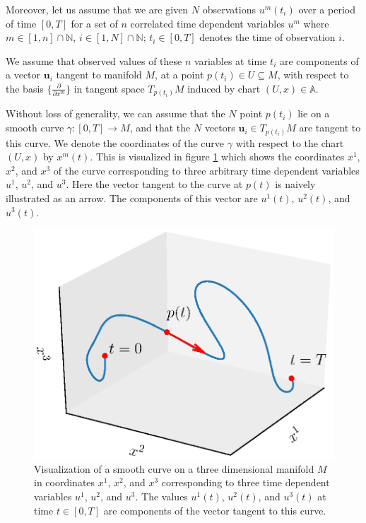 \documentclass[a4paper,11pt]{elsarticle}
\begin{document}
Moreover, let us assume that we are given $N$ observations
$u^{m}(t_{i})$ over a period of time $[0,T]$ for a set of $n$
correlated time dependent variables $u^{m}$ where $m \in [1,n] \cap
\mathbb{N}$, $i \in[1,N] \cap \mathbb{N}$; $t_{i} \in [0,T]$ denotes
the time of observation $i$.

We assume that observed values of these $n$ variables at time $t_{i}$
are components of a vector $\mathbf{u}_{i}$ tangent to manifold $M$,
at a point $p(t_{i}) \in U \subseteq M$, with respect to the basis
$\{\frac{\partial}{\partial{x^{m}}}\}$ in tangent space $T_{p(t_{i})}M$
induced by chart $(U, x) \in \mathbb{A}$.

Without loss of generality, we can assume that the $N$ point $p(t_{i})$
lie on a smooth curve $\gamma:[0,T] \to M$, and that the $N$ vectors
$\mathbf{u}_{i} \in T_{p(t_{i})}M$ are tangent to this curve. We denote
the coordinates of the curve $\gamma$ with respect to the chart $(U,
x)$ by $x^{m}(t)$. This is visualized in figure
\ref{fig:visualization} which shows the coordinates $x^{1}$, $x^{2}$,
and $x^{3}$ of the curve corresponding to three arbitrary time
dependent variables $u^{1}$, $u^{2}$, and $u^{3}$. Here the vector
tangent to the curve at $p(t)$ is naively illustrated as an
arrow. The components of this vector are $u^{1}(t)$, $u^{2}(t)$, and
$u^{3}(t)$.

\begin{figure}[h]
  \centering
  \includegraphics[scale=0.6, bb=0 0 461 346,trim={1cm 1cm 1cm 2cm},clip]{visualization.eps}
  \caption{Visualization of a smooth curve on a three dimensional
    manifold $M$ in coordinates $x^{1}$, $x^{2}$, and $x^{3}$
    corresponding to three time dependent variables $u^{1}$, $u^{2}$,
    and $u^{3}$. The values $u^{1}(t)$, $u^{2}(t)$, and $u^{3}(t)$ at
    time $t \in [0,T]$ are components of the vector tangent to this
    curve.}
  \label{fig:visualization}
\end{figure}
\end{document}
